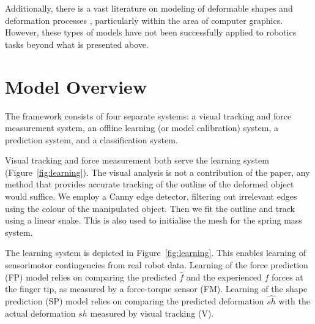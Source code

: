 \documentclass[journal]{IEEEtran}
\begin{document}
Additionally, there is a vast literature on modeling of deformable shapes and deformation processes \cite{Gibson1997, McInerney1996, Montagnat2001, Moore2007review, Nealen2006review}, particularly within the area of computer graphics.  However, these types of models have not been successfully applied to robotics tasks beyond what is presented above.


\section{Model Overview}
\label{sec:model_overview}

The framework consists of four separate systems: a visual tracking and force measurement system, an offline learning (or model calibration) system, a prediction system, and a classification system. 

Visual tracking and force measurement both serve the learning system (Figure~\ref{fig:learning}). The visual analysis is not a contribution of the paper, any method that provides accurate tracking of the outline of the deformed object would suffice. We employ a Canny edge detector, filtering out irrelevant edges using the colour of the manipulated object. Then we fit the outline and track using a linear snake. This is also used to initialise the mesh for the spring mass system.

The learning system is depicted in Figure~\ref{fig:learning}. This enables learning of sensorimotor contingencies from real robot data. Learning of the force prediction (FP) model relies on comparing the predicted $\hat{f}$ and the experienced $f$ forces at the finger tip, as measured by a force-torque sensor (FM). Learning of the shape prediction (SP) model relies on comparing the predicted deformation $\hat{sh}$ with the actual deformation $sh$ measured by visual tracking (V).
\end{document}
